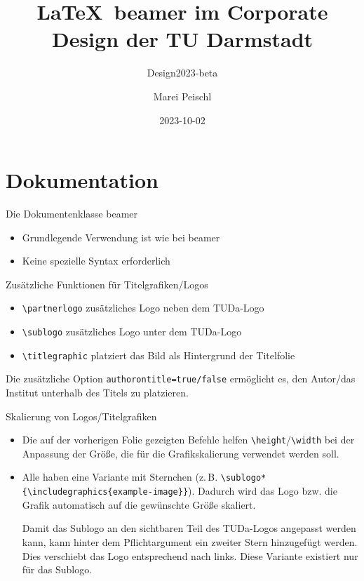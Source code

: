 \documentclass[
	german,%
	accentcolor=9c,%
]{tudabeamer}
\title[TUDaBeamer2023]{\LaTeX~beamer im Corporate Design der TU Darmstadt}
\subtitle{Design2023-beta}
\author[M. Peischl]{Marei Peischl}
\institute{pei\TeX}
\date{2023-10-02}%
\newcommand*{\code}[1]{\texttt{#1}}
\begin{document}
\maketitle

\tableofcontents

\section{Dokumentation}

\begin{frame}{Die Dokumentenklasse beamer}
	\begin{itemize}
		\item Grundlegende Verwendung ist wie bei beamer
		\item Keine spezielle Syntax erforderlich
	\end{itemize}
\end{frame}

\begin{frame}{Zusätzliche Funktionen für Titelgrafiken/Logos}
	\begin{itemize}
		\item \code{\textbackslash{}partnerlogo} zusätzliches Logo neben dem TUDa-Logo
		\item \code{\textbackslash{}sublogo} zusätzliches Logo unter dem TUDa-Logo
		\item \code{\textbackslash{}titlegraphic} platziert das Bild als Hintergrund der Titelfolie
	\end{itemize}
	Die zusätzliche Option \code{authorontitle=true/false} ermöglicht es, den Autor/das Institut unterhalb des Titels zu platzieren.
\end{frame}

\begin{frame}{Skalierung von Logos/Titelgrafiken}
	\begin{itemize}
		\item Die auf der vorherigen Folie gezeigten Befehle helfen \code{\textbackslash{}height}/\code{\textbackslash{}width} bei der Anpassung der Größe, die für die Grafikskalierung verwendet werden soll.
		\item Alle haben eine Variante mit Sternchen (z.\,B. \code{\textbackslash{}sublogo*\{\textbackslash{}includegraphics\{example-image\}\}}). Dadurch wird das Logo bzw. die Grafik automatisch auf die gewünschte Größe skaliert.

		      Damit das Sublogo an den sichtbaren Teil des TUDa-Logos angepasst werden kann, kann hinter dem Pflichtargument ein zweiter Stern hinzugefügt werden. Dies verschiebt das Logo entsprechend nach links. Diese Variante existiert nur für das Sublogo.
	\end{itemize}
\end{frame}
\end{document}
